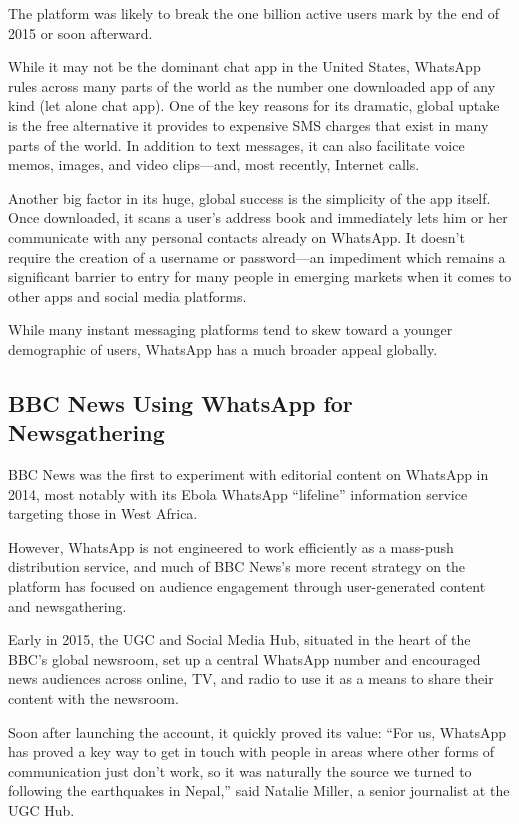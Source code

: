 \documentclass[notoc, symmetric, nobib, nols]{towcenter-guideto-book}
\begin{document}
The platform was likely to break the one billion active users mark by the end of 2015 or soon afterward. 

While it may not be the dominant chat app in the United States, WhatsApp rules across many parts of the world as the number one downloaded app of any kind (let alone chat app). One of the key reasons for its dramatic, global uptake is the free alternative it provides to expensive SMS charges that exist in many parts of the world. In addition to text messages, it can also facilitate voice memos, images, and video clips---and, most recently, Internet calls.

Another big factor in its huge, global success is the simplicity of the app itself. Once downloaded, it scans a user's address book and immediately lets him or her communicate with any personal contacts already on WhatsApp. It doesn't require the creation of a username or password---an impediment which remains a significant barrier to entry for many people in emerging markets when it comes to other apps and social media platforms.

While many instant messaging platforms tend to skew toward a younger demographic of users, WhatsApp has a much broader appeal globally.

\subsection{BBC News Using WhatsApp for Newsgathering}

BBC News was the first to experiment with editorial content on WhatsApp in 2014, most notably with its Ebola WhatsApp ``lifeline'' information service targeting those in West Africa.\autocite{BarotEbola} 

However, WhatsApp is not engineered to work efficiently as a mass-push distribution service, and much of BBC News's more recent strategy on the platform has focused on audience engagement through user-generated content and newsgathering. 

Early in 2015, the UGC and Social Media Hub, situated in the heart of the BBC's global newsroom, set up a central WhatsApp number and encouraged news audiences across online, TV, and radio to use it as a means to share their content with the newsroom.\autocite{BBCWhatsApp} 

Soon after launching the account, it quickly proved its value: ``For us, WhatsApp has proved a key way to get in touch with people in areas where other forms of communication just don't work, so it was naturally the source we turned to following the earthquakes in Nepal,'' said Natalie Miller, a senior journalist at the UGC Hub.
\end{document}
